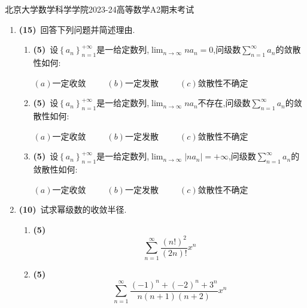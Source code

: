 \documentclass{ctexart}
\begin{document}
\pagestyle{empty}
\begin{center}\Large
    北京大学数学科学学院2023-24高等数学A2期末考试
\end{center}
\begin{enumerate}[leftmargin=*,label=\textbf{\arabic*.},topsep=0pt,parsep=0pt,itemsep=0pt,partopsep=0pt]
    \item \textbf{(15)}\ 回答下列问题并简述理由.
        \begin{enumerate}[label=\tbf{(\arabic*)},topsep=0pt,parsep=0pt,itemsep=0pt,partopsep=0pt]
            \item \textbf{(5)}\ 设$\left\{a_n\right\}_{n=1}^{+\infty}$是一给定数列,$\displaystyle\lim_{n\to\infty}na_n=0$,问级数$\displaystyle\sum_{n=1}^{\infty}a_n$的敛散性如何:
                \begin{center}
                    $(a)$一定收敛\ \ \ \ \ $(b)$一定发散\ \ \ \ \ $(c)$敛散性不确定
                \end{center}
            \item \textbf{(5)}\ 设$\left\{a_n\right\}_{n=1}^{+\infty}$是一给定数列,$\displaystyle\lim_{n\to\infty}na_n$不存在,问级数$\displaystyle\sum_{n=1}^{\infty}a_n$的敛散性如何:
                \begin{center}
                    $(a)$一定收敛\ \ \ \ \ $(b)$一定发散\ \ \ \ \ $(c)$敛散性不确定
                \end{center}
            \item \textbf{(5)}\ 设$\left\{a_n\right\}_{n=1}^{+\infty}$是一给定数列,$\displaystyle\lim_{n\to\infty}\left|na_n\right|=+\infty$,问级数$\displaystyle\sum_{n=1}^{\infty}a_n$的敛散性如何:
                \begin{center}
                    $(a)$一定收敛\ \ \ \ \ $(b)$一定发散\ \ \ \ \ $(c)$敛散性不确定
                \end{center}
        \end{enumerate}

    \item \textbf{(10)}\ 试求幂级数的收敛半径.
        \begin{enumerate}[label=\tbf{(\arabic*)},topsep=0pt,parsep=0pt,itemsep=0pt,partopsep=0pt]
            \item \textbf{(5)}
                \[\sum_{n=1}^{\infty}\dfrac{\left(n!\right)^2}{(2n)!}x^n\]
            \item \textbf{(5)}
                \[\sum_{n=1}^{\infty}\dfrac{(-1)^n+(-2)^n+3^n}{n(n+1)(n+2)}x^n\]


\end{enumerate}
\end{enumerate}
\end{document}
